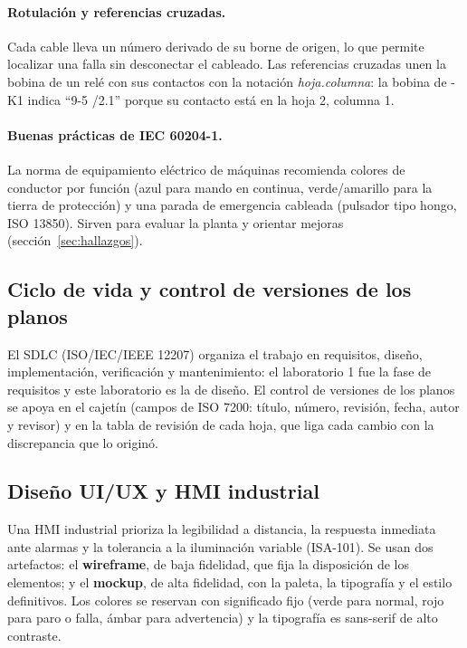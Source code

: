 \documentclass[a4paper,11pt]{article}
\begin{document}
\paragraph{Rotulación y referencias cruzadas.} Cada cable lleva un número derivado de su borne de origen, lo que permite localizar una falla sin desconectar el cableado. Las referencias cruzadas unen la bobina de un relé con sus contactos con la notación \emph{hoja.columna}: la bobina de -K1 indica ``9-5 /2.1'' porque su contacto está en la hoja 2, columna 1.

\paragraph{Buenas prácticas de IEC 60204-1.} La norma de equipamiento eléctrico de máquinas recomienda colores de conductor por función (azul para mando en continua, verde/amarillo para la tierra de protección) y una parada de emergencia cableada (pulsador tipo hongo, ISO 13850). Sirven para evaluar la planta y orientar mejoras (sección~\ref{sec:hallazgos}).

\subsection{Ciclo de vida y control de versiones de los planos}
El SDLC (ISO/IEC/IEEE 12207) organiza el trabajo en requisitos, diseño, implementación, verificación y mantenimiento: el laboratorio 1 fue la fase de requisitos y este laboratorio es la de diseño. El control de versiones de los planos se apoya en el cajetín (campos de ISO 7200: título, número, revisión, fecha, autor y revisor) y en la tabla de revisión de cada hoja, que liga cada cambio con la discrepancia que lo originó.

\subsection{Diseño UI/UX y HMI industrial}
Una HMI industrial prioriza la legibilidad a distancia, la respuesta inmediata ante alarmas y la tolerancia a la iluminación variable (ISA-101). Se usan dos artefactos: el \textbf{wireframe}, de baja fidelidad, que fija la disposición de los elementos; y el \textbf{mockup}, de alta fidelidad, con la paleta, la tipografía y el estilo definitivos. Los colores se reservan con significado fijo (verde para normal, rojo para paro o falla, ámbar para advertencia) y la tipografía es sans-serif de alto contraste.

\end{document}
